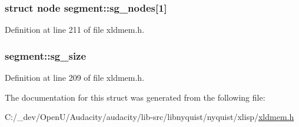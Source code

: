 \subsubsection[{\texorpdfstring{sg\+\_\+nodes}{sg_nodes}}]{\setlength{\rightskip}{0pt plus 5cm}struct {\bf node} segment\+::sg\+\_\+nodes\mbox{[}1\mbox{]}}\hypertarget{structsegment_a66f1b35a18959fb99ef4357b6f949c78}{}\label{structsegment_a66f1b35a18959fb99ef4357b6f949c78}


Definition at line 211 of file xldmem.\+h.

\subsubsection[{\texorpdfstring{sg\+\_\+size}{sg_size}}]{ segment\+::sg\+\_\+size}\hypertarget{structsegment_aae76e400e607ee28424e82c27b7eadd9}{}\label{structsegment_aae76e400e607ee28424e82c27b7eadd9}


Definition at line 209 of file xldmem.\+h.



The documentation for this struct was generated from the following file\+:\begin{DoxyCompactItemize}
\item 
C\+:/\+\_\+dev/\+Open\+U/\+Audacity/audacity/lib-\/src/libnyquist/nyquist/xlisp/\hyperlink{xldmem_8h}{xldmem.\+h}\end{DoxyCompactItemize}
